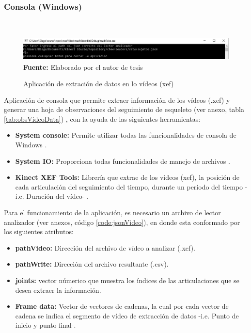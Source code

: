 \subsubsection{Consola (Windows)}\mbox{} \\ \label{ins:cons}
\begin{figure}[H]
	\caption{Aplicaci\'on de extraci\'on de datos en lo v\'ideos (xef)}
	\label{fig:appConsole}
	\centering
	\includegraphics[width=460px,height=50px]{graphics/appConsole.PNG} \\
	\textbf{Fuente:} Elaborado por el autor de tesis
\end{figure} 
Aplicaci\'on de consola que permite extraer informaci\'on de los v\'ideos (.xef) y generar una hoja de observaciones del seguimiento de esqueleto (ver anexo, tabla \ref{tab:obsVideoData}) , con la ayuda de las siguientes herramientas:
\begin{itemize}
\item \textbf{System console:} Permite utilizar todas las funcionalidades de consola de Windows \cite{windowConsole2019}.
\item \textbf{System IO:} Proporciona todas funcionalidades de manejo de archivos \cite{windowIO2019}.
\item \textbf{Kinect XEF Tools:} Librer\'ia que extrae de los v\'ideos (xef), la posici\'on de cada articulaci\'on del seguimiento del tiempo, durante un per\'iodo del tiempo -i.e. Duraci\'on del v\'ideo- \cite{kinectXEFTools}.
\end{itemize}
Para el funcionamiento de la aplicaci\'on, es necesario un archivo de lector analizador (ver anexos, c\'odigo \ref{code:jsonVideo}), en donde esta conformado por los siguientes atributos:
\begin{itemize}
\item \textbf{pathVideo:} Direcci\'on del archivo  de v\'ideo a analizar (.xef).
\item \textbf{pathWrite:} Direcci\'on del archivo  resultante (.csv).
\item \textbf{joints:} vector n\'umerico que muestra los \'indices de las articulaciones que se desea extraer la informaci\'on.
\item \textbf{Frame data:} Vector de vectores de cadenas, la cual por cada vector de cadena se indica el segmento de v\'ideo de extracci\'on de datos -i.e. Punto de inicio y punto final-.
\end{itemize}
